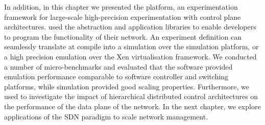 In addition, in this chapter we presented the \sdnsim platform, an experimentation
framework for large-scale high-precision experimentation with control plane
architectures. \sdnsim used the \mirage abstraction and application libraries to enable
developers to program the functionality of their network. An \sdnsim experiment
definition can seamlessly translate at compile into a simulation over the 
simulation platform, or a high precision emulation over the Xen virtualisation
framework. We conducted a number of micro-benchmarks and evaluated that the
software provided emulation performance comparable to software \of controller and
switching platforms, while \sdnsim simulation provided good scaling properties.
Furthermore, we used \sdnsim to investigate the impact of hierarchical distributed
control architectures on the performance of the data plane of the network.  In
the next chapter, we explore applications of the SDN paradigm to scale network
management. 

